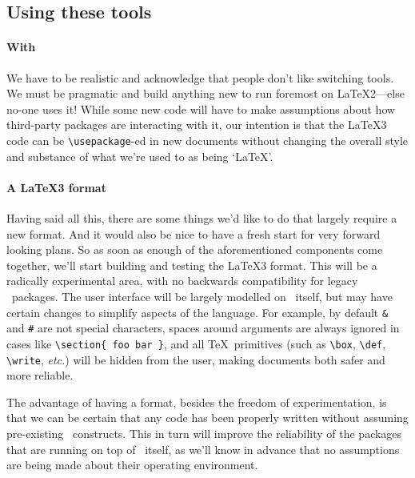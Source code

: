 \documentclass{ltnews}
\begin{document}
\subsection{Using these tools}

\paragraph{With \LaTeXe}

We have to be realistic and acknowledge that people don't like switching tools.
We must be pragmatic and build anything new to run foremost on \LaTeX2---else no-one uses it!
While some new code will have to make assumptions about how third-party packages are interacting with it, our intention is that the \LaTeX3 code can be \verb|\usepackage|-ed in new documents without changing the overall style and substance of what we're used to as being `\LaTeX'.

\paragraph{A \LaTeX3 format}

Having said all this, there are some things we'd like to do that largely require a new format.
And it would also be nice to have a fresh start for very forward looking plans.
So as soon as enough of the aforementioned components come together, we'll start building and testing the \LaTeX3 format.
This will be a radically experimental area, with no backwards compatibility for legacy \LaTeXe\ packages.
The user interface will be largely modelled on \LaTeXe\ itself, but may have certain changes to simplify aspects of the language.
For example, by default \verb|&| and \verb|#| are not special characters, spaces around arguments are always ignored in cases like \verb|\section{ foo bar }|, and all \TeX\ primitives (such as \verb|\box|, \verb|\def|, \verb|\write|, \emph{etc.}) will be hidden from the user, making documents both safer and more reliable.

The advantage of having a format, besides the freedom of experimentation, is that we can be certain that any code has been properly written without assuming pre-existing \LaTeXe\ constructs.
This in turn will improve the reliability of the packages that are running on top of \LaTeXe\ itself, as we'll know in advance that no assumptions are being made about their operating environment.
\end{document}
